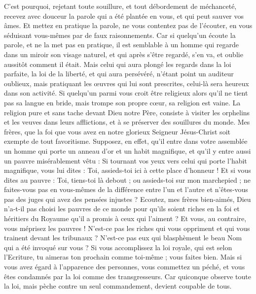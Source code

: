\begin{multicols}{2}
C'est pourquoi, rejetant toute souillure, et tout débordement de méchanceté, recevez avec douceur la parole qui a été plantée en vous, et qui peut sauver vos âmes.
Et mettez en pratique la parole, ne vous contentez pas de l'écouter, en vous séduisant vous-mêmes par de faux raisonnements.
Car si quelqu'un écoute la parole, et ne la met pas en pratique, il est semblable à un homme qui regarde dans un miroir son visage naturel,
et qui après s'être regardé, s'en va, et oublie aussitôt comment il était.
Mais celui qui aura plongé les regards dans la loi parfaite, la loi de la liberté, et qui aura persévéré, n'étant point un auditeur oublieux, mais pratiquant les œuvres qui lui sont prescrites, celui-là sera heureux dans son activité.
Si quelqu'un parmi vous croit être religieux alors qu’il ne tient pas sa langue en bride, mais trompe son propre cœur, sa religion est vaine.
La religion pure et sans tache devant Dieu notre Père, consiste à visiter les orphelins et les veuves dans leurs afflictions, et à se préserver des souillures du monde.
\VerseOne{}Mes frères, que la foi que vous avez en notre glorieux Seigneur Jésus-Christ soit exempte de tout favoritisme.
Supposez, en effet, qu’il entre dans votre assemblée un homme qui porte un anneau d'or et un habit magnifique, et qu’il y entre aussi un pauvre misérablement vêtu :
Si tournant vos yeux vers celui qui porte l’habit magnifique, vous lui dites : Toi, assieds-toi ici à cette place d’honneur ! Et si vous dites au pauvre : Toi, tiens-toi là debout ; ou assieds-toi sur mon marchepied ;
ne faites-vous pas en vous-mêmes de la différence entre l’un et l’autre et n'êtes-vous pas des juges qui avez des pensées injustes ?
Ecoutez, mes frères bien-aimés, Dieu n'a-t-il pas choisi les pauvres de ce monde pour qu’ils soient riches en la foi et héritiers du Royaume qu'il a promis à ceux qui l'aiment ?
Et vous, au contraire, vous méprisez les pauvres ! N’est-ce pas les riches qui vous oppriment et qui vous trainent devant les tribunaux ?
N’est-ce pas eux qui blasphèment le beau Nom qui a été invoqué sur vous ?
Si vous accomplissez la loi royale, qui est selon l'Ecriture, tu aimeras ton prochain comme toi-même{} ; vous faites bien.
Mais si vous avez égard à l'apparence des personnes, vous commettez un péché, et vous êtes condamnés par la loi comme des transgresseurs.
Car quiconque observe toute la loi, mais pèche contre un seul commandement, devient coupable de tous.

\end{multicols}
